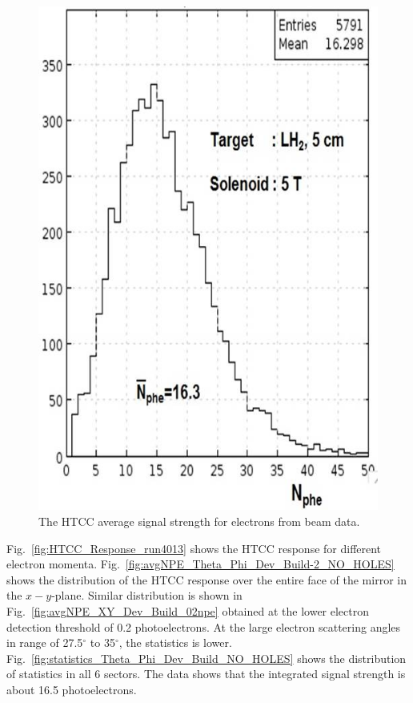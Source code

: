 \begin{figure}[!ht]
    \centering
    \includegraphics[width=1.0\linewidth,trim={0.0cm 0.0cm 0.0cm 0.0cm},clip]{images/Average_HTCC_Signal.jpg}
    \caption{The HTCC average signal strength for electrons from beam data.}
    \label{fig:Average_HTCC_Signal}
\end{figure}

Fig.~\ref{fig:HTCC_Response_run4013} shows the HTCC response for different electron momenta. Fig.~\ref{fig:avgNPE_Theta_Phi_Dev_Build-2_NO_HOLES}  shows the distribution of the HTCC response over the entire face of the mirror in the $x-y$-plane. Similar distribution is shown in Fig.~\ref{fig:avgNPE_XY_Dev_Build_02npe} obtained at the lower electron detection threshold of 0.2 photoelectrons. At the large electron scattering angles in range of 27.5$^\circ$ to 35$^\circ$, the statistics is lower. Fig.~\ref{fig:statistics_Theta_Phi_Dev_Build_NO_HOLES} shows the distribution of statistics in all 6 sectors. The data shows that the integrated signal strength is about 16.5 photoelectrons.

